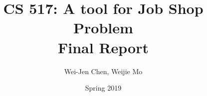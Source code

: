 \documentclass[12pt]{article}
\title{CS 517: A tool for Job Shop Problem \\ Final Report}
\date{Spring 2019}
\author{Wei-Jen Chen, Weijie Mo}
\makeatletter
\let\inserttitle\@title
\makeatother
\begin{document}
\begin{center}
  \LARGE{\inserttitle}

  \Large{\@author}
\end{center}

\hrulefill





\newpage




\end{document}
